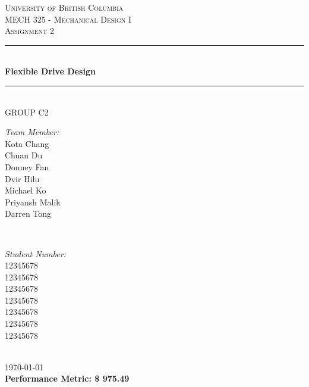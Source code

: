 \documentclass[letterpaper,12pt]{article}
\begin{document}
	
\begin{titlepage}
	
	\newcommand{\HRule}{\rule{\linewidth}{0.5mm}}
	
	\center
	
	\textsc{\LARGE University of British Columbia}\\[1.5cm]
	\textsc{\Large MECH 325 - Mechanical Design I}\\[0.5cm]
	\textsc{\Large Assignment 2}\\[0.5cm]
	
	\HRule \\[0.8cm]
	{ \huge \bfseries Flexible Drive Design}\\[0.4cm]
	\HRule \\[1cm]
	
	{\Large GROUP C2}\\
	\vspace{0.5cm}
	
	\begin{minipage}{0.4\textwidth}
		\begin{flushleft} \large
			\emph{Team Member:}\\
			Kota Chang\\
			Chuan Du\\
			Donney Fan\\
			Dvir Hilu\\
			Michael Ko\\
			Priyansh Malik\\
			Darren Tong\\
		\end{flushleft}
	\end{minipage}
	~
	\begin{minipage}{0.4\textwidth}
		\begin{flushright} \large
			\emph{Student Number:} \\
			12345678\\
			12345678\\
			12345678\\
			12345678\\
			12345678\\
			12345678\\
			12345678
			
		\end{flushright}
	\end{minipage}\\[2cm]
	
	{\large \today}\\[2cm]
	
	{\Large\textbf{
		Performance Metric: \$ 975.49
	}}
	
	
	\vfill %
	
\end{titlepage}
\end{document}
